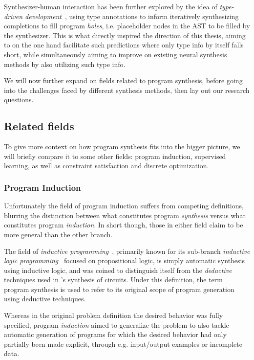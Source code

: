 \documentclass{article}
\begin{document}
Synthesizer-human interaction has been further explored by the idea of \emph{type-driven development}~\citep{brady2017type},
using type annotations to inform iteratively synthesizing completions to fill program \emph{holes},
i.e. placeholder nodes in the AST to be filled by the synthesizer.
This is what directly inspired the direction of this thesis,
aiming to on the one hand facilitate such predictions where only type info by itself falls short,
while simultaneously aiming to improve on existing neural synthesis methods by also utilizing such type info.

We will now further expand on fields related to program synthesis,
before going into the challenges faced by different synthesis methods,
then lay out our research questions.

\subsection{Related fields}

To give more context on how program synthesis fits into the bigger picture,
we will briefly compare it to some other fields: program induction, supervised learning, as well as constraint satisfaction and discrete optimization.

\subsubsection{Program Induction}

Unfortunately the field of program induction suffers from competing definitions, blurring the distinction between what constitutes program \emph{synthesis} versus what constitutes program \emph{induction}. In short though, those in either field claim to be more general than the other branch.

The field of \emph{inductive programming}~\citep{popplestone1969experiment,plotkin1970note,fogel1966intelligent},
primarily known for its sub-branch \emph{inductive logic programming}~\citep{muggleton1991inductive} focused on propositional logic,
is simply automatic synthesis using inductive logic,
and was coined to distinguish itself from the \emph{deductive} techniques used in \citet{church1957applications}'s synthesis of circuits.
Under this definition, the term program synthesis is used to refer to its original scope of program generation using deductive techniques.

Whereas in the original problem definition the desired behavior was fully specified, program \emph{induction} aimed to generalize the problem to also tackle automatic generation of programs for which the desired behavior had only partially been made explicit, through e.g. input/output examples or incomplete data.
\end{document}
